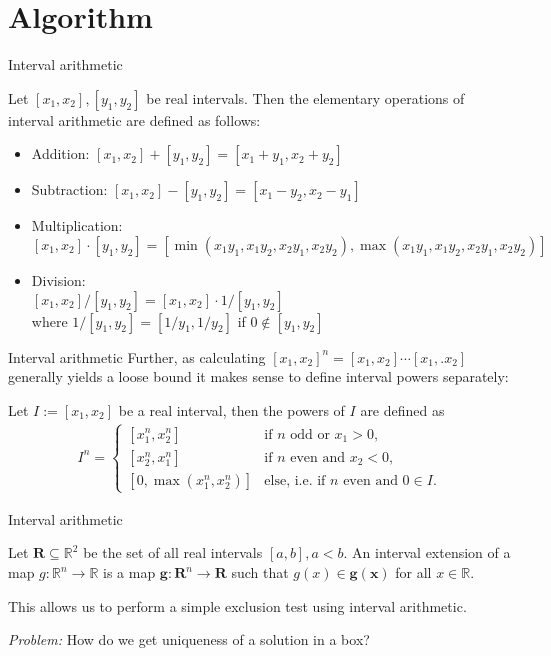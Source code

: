 \documentclass[german,10pt,xcolor=colortbl,compress, handout]{beamer}
\begin{document}
\section{Algorithm}
\begin{frame}{Interval arithmetic}
    \begin{definition}
    Let $[x_1,x_2], [y_1,y_2]$ be real intervals. Then the elementary operations of interval arithmetic are defined as follows:
        \begin{itemize}
            \item Addition: $[x_1,x_2] + [y_1,y_2] = [x_1+y_1,x_2+y_2]$
            \item Subtraction: $[x_1,x_2] - [y_1,y_2] = [x_1-y_2,x_2-y_1]$
            \item Multiplication: $[x_1,x_2] \cdot [y_1,y_2] = [\min(x_1y_1,x_1y_2,x_2y_1,x_2y_2), \max(x_1y_1,x_1y_2,x_2y_1,x_2y_2)]$
            \item Division: \\ $[x_1,x_2] / [y_1,y_2] = [x_1,x_2] \cdot 1/[y_1,y_2]$ \\where $1/[y_1,y_2]= [1/y_1, 1/y_2]$ if $0 \notin [y_1,y_2] $
        \end{itemize}
    \end{definition}
\end{frame}

\begin{frame}{Interval arithmetic}
    Further, as calculating $[x_1,x_2]^n = [x_1, x_2] \cdots [x_1,. x_2]$ generally yields a
    loose bound it makes sense to define interval powers separately:
    \begin{definition}
        Let $I := [x_1, x_2]$ be a real interval, then the powers of $I$ are defined
        as
        \begin{align*}
            I^n =
            \begin{cases}
                [x_1^n, x_2^n] & \text{if $n$ odd or $x_1 > 0$,} \\
                [x_2^n, x_1^n] & \text{if $n$ even and $x_2 < 0$,} \\
                [0, \max(x_1^n, x_2^n)] & \text{else, i.e. if $n$ even and $0\in I$.}
            \end{cases}
        \end{align*}
    \end{definition}
\end{frame}

\begin{frame}{Interval arithmetic}
    \begin{definition}
        Let  $\mathbf{R} \subseteq \mathbb{R}^2$ be the set of all real intervals $[a,b],
        a < b$. An interval extension of a map $g: \mathbb{R}^n \to \mathbb{R}$ is a map
        $\mathbf{g}: \mathbf{R}^n \to \mathbf{R}$ such that $g(x) \in
        \mathbf{g}(\mathbf{x}) $ for all $x \in \mathbb{R}$.
    \end{definition}

    This allows us to perform a simple exclusion test using interval arithmetic.
    \bigskip

    \emph{Problem:} How do we get uniqueness of a solution in a box?
\end{frame}
\end{document}
